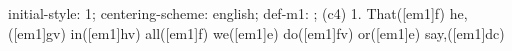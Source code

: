 initial-style: 1;
centering-scheme: english;
def-m1: \grealign;
(c4) 1. That([em1]f) he,([em1]gv) in([em1]hv) all([em1]f) we([em1]e) do([em1]fv) or([em1]e) say,([em1]dc)
